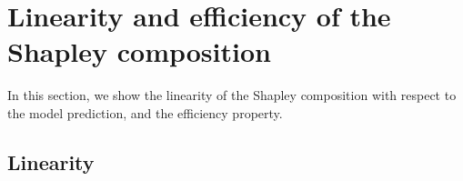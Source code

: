 \documentclass{article}
\theoremstyle{plain}
\theoremstyle{definition}
\theoremstyle{remark}
\begin{document}




\newpage
\appendix
\onecolumn

\section{Linearity and efficiency of the Shapley composition}
\label{app:properties}
In this section, we show the linearity of the Shapley composition with respect to the model prediction, and the efficiency property.

\subsection{Linearity}
\end{document}
